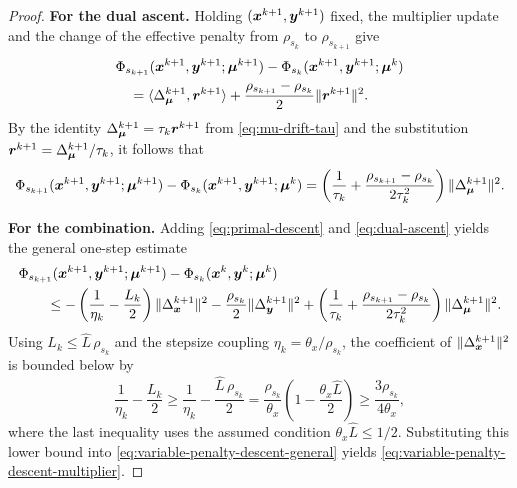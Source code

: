 \begin{proof}
\textbf{For the dual ascent.}
Holding $(\bm{x}^{k+1},\bm{y}^{k+1})$ fixed, the multiplier update and the
change of the effective penalty from $\rho_{s_k}$ to $\rho_{s_{k+1}}$
give
\[
\begin{aligned}
    &\Phi_{s_{k+1}}(\bm{x}^{k+1},\bm{y}^{k+1};\bm{\mu}^{k+1})
    -\Phi_{s_k}(\bm{x}^{k+1},\bm{y}^{k+1};\bm{\mu}^k)\\
    &\quad=
    \langle \Delta_{\bm{\mu}}^{k+1},\bm{r}^{k+1}\rangle
    +\frac{\rho_{s_{k+1}}-\rho_{s_k}}{2}\|\bm{r}^{k+1}\|^2.
\end{aligned}
\]
By the identity $\Delta_{\bm{\mu}}^{k+1}=\tau_k\bm{r}^{k+1}$ from
\eqref{eq:mu-drift-tau} and the substitution
$\bm{r}^{k+1}=\Delta_{\bm{\mu}}^{k+1}/\tau_k$, it follows that
\begin{equation}
    \Phi_{s_{k+1}}(\bm{x}^{k+1},\bm{y}^{k+1};\bm{\mu}^{k+1})
    -\Phi_{s_k}(\bm{x}^{k+1},\bm{y}^{k+1};\bm{\mu}^k)
    =
    \left(\frac{1}{\tau_k}
    +\frac{\rho_{s_{k+1}}-\rho_{s_k}}{2\tau_k^2}\right)
    \|\Delta_{\bm{\mu}}^{k+1}\|^2.
    \label{eq:dual-ascent}
\end{equation}

\textbf{For the combination.}
Adding \eqref{eq:primal-descent} and \eqref{eq:dual-ascent} yields the
general one-step estimate
\begin{equation}
\begin{aligned}
    &\Phi_{s_{k+1}}(\bm{x}^{k+1},\bm{y}^{k+1};\bm{\mu}^{k+1})
    -\Phi_{s_k}(\bm{x}^k,\bm{y}^k;\bm{\mu}^k)\\
    &\qquad\le
    -\left(\frac{1}{\eta_k}-\frac{L_k}{2}\right)
    \|\Delta_{\bm{x}}^{k+1}\|^2
    -\frac{\rho_{s_k}}{2}\|\Delta_{\bm{y}}^{k+1}\|^2
    +\left(\frac{1}{\tau_k}
    +\frac{\rho_{s_{k+1}}-\rho_{s_k}}{2\tau_k^2}\right)
    \|\Delta_{\bm{\mu}}^{k+1}\|^2.
\end{aligned}
\label{eq:variable-penalty-descent-general}
\end{equation}
Using $L_k\le\widehat L\,\rho_{s_k}$ and the stepsize coupling
$\eta_k=\theta_x/\rho_{s_k}$, the coefficient of
$\|\Delta_{\bm{x}}^{k+1}\|^2$ is bounded below by
\[
    \frac{1}{\eta_k}-\frac{L_k}{2}
    \ge\frac{1}{\eta_k}-\frac{\widehat L\,\rho_{s_k}}{2}
    =\frac{\rho_{s_k}}{\theta_x}\!\left(1-\frac{\theta_x\widehat L}{2}\right)
    \ge\frac{3\rho_{s_k}}{4\theta_x},
\]
where the last inequality uses the assumed condition
$\theta_x\widehat L\le 1/2$.  Substituting this lower bound into
\eqref{eq:variable-penalty-descent-general} yields
\eqref{eq:variable-penalty-descent-multiplier}.
\end{proof}

